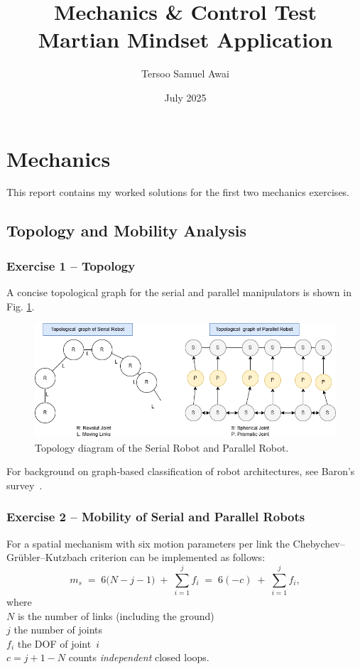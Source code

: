 \documentclass[12pt,a4paper]{article}
\title{Mechanics \& Control Test \\[2pt]\large Martian Mindset Application}
\author{Tersoo Samuel Awai}
\date{July 2025}
\begin{document}
\maketitle

\section{Mechanics}
This report contains my worked solutions for the first two mechanics exercises.
\subsection{Topology and Mobility Analysis}
\subsubsection*{Exercise 1 -- Topology}
A concise topological graph for the serial and parallel manipulators is shown
in Fig. \ref{fig:serial-graph}.  

\begin{figure}[htbp]
  \centering
  \includegraphics[width=0.9\linewidth]{../figs/topology.png}
  \caption{Topology diagram of the Serial Robot and Parallel Robot.}
  \label{fig:serial-graph}
\end{figure}



For background on graph‐based classification of
robot architectures, see Baron’s survey~\cite{Baron2008}.

\subsubsection*{Exercise 2 -- Mobility of Serial and Parallel Robots}

For a spatial mechanism with six motion parameters per link the Chebychev–Grübler–Kutzbach criterion can be implemented as follows:
\begin{equation}
m_s \;=\; 6\bigl(N - j - 1\bigr) \;+\; \sum_{i=1}^{j} f_i
       \;=\; 6(-c) \;+\; \sum_{i=1}^{j} f_i ,
\end{equation}
where \\ \(N\) is the number of links (including the ground) \\ 
\(j\) the number of joints\\ \(f_i\) the DOF of joint~\(i\) \\  
\(c = j + 1 - N\) counts \emph{independent} closed loops.
\end{document}
